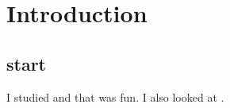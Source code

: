 \documentclass[../Thesis]{subfiles}
\begin{document}
\chapter{Introduction}

\section{start}

I studied \cite{PSO2007} and that was fun. I also looked at \cite{SPSO2011}.
\end{document}
